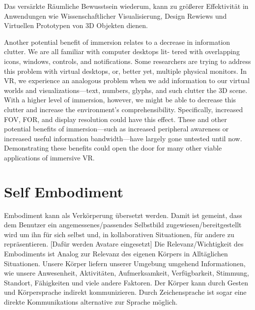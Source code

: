 Das versärkte Räumliche Bewusstsein wiederum, kann zu größerer Effektivität in Anwendungen wie Wissenschaftlicher Visualisierung, Design Rewiews und Virtuellen Prototypen von 3D Objekten dienen.

Another potential benefit of immersion relates to a decrease in
information clutter. We are all familiar with computer desktops lit-
tered with overlapping icons, windows, controls, and notifications.
Some researchers are trying to address this problem with virtual
desktops, or, better yet, multiple physical monitors.
In VR, we experience an analogous problem when we add
information to our virtual worlds and visualizations—text,
numbers, glyphs, and such clutter the 3D scene. With a higher
level of immersion, however, we might be able to decrease
this clutter and increase the environment’s comprehensibility.
Specifically, increased FOV, FOR, and display resolution could
have this effect.
These and other potential benefits of immersion—such as
increased peripheral awareness or increased useful information
bandwidth—have largely gone untested until now. Demonstrating
these benefits could open the door for many other viable applications of immersive VR.


\section{Self Embodiment}
Embodiment kann als Verkörperung übersetzt werden. Damit ist gemeint, dass dem Benutzer ein angemessenes/passendes Selbstbild zugewiesen/bereitgestellt wird um ihn für sich selbst und, in kollaborativen Situationen, für andere zu repräsentieren. [Dafür werden Avatare eingesetzt]
Die Relevanz/Wichtigkeit des Embodiments ist Analog zur Relevanz des eigenen Körpers in Alltäglichen Situationen. Unsere Körper liefern unserer Umgebung umgehend Informationen, wie unsere Anwesenheit, Aktivitäten, Aufmerksamkeit, Verfügbarkeit, Stimmung, Standort, Fähigkeiten und viele andere Faktoren. Der Körper kann durch Gesten und Körpersprache indirekt kommunizieren. Durch Zeichensprache ist sogar eine direkte Kommunikations alternative zur Sprache möglich.\cite{Benford2010}

